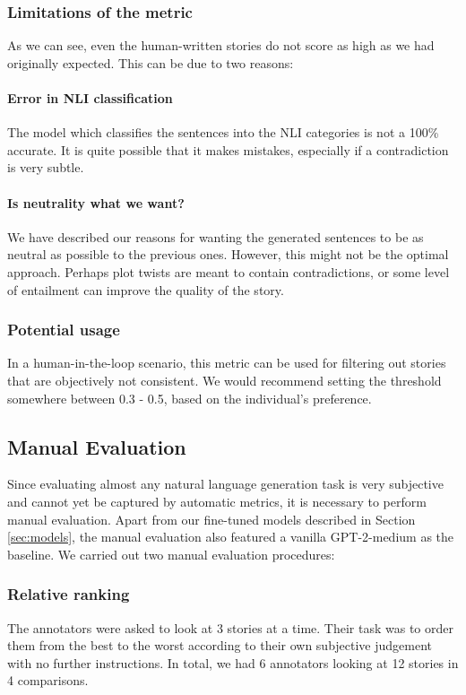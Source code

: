 \documentclass[11pt,a4paper]{article}
\begin{document}
\subsubsection{Limitations of the metric}
As we can see, even the human-written stories do not score as high as we had originally expected. This can be due to two reasons:

\paragraph{Error in NLI classification}
The model which classifies the sentences into the NLI categories is not a 100\% accurate. It is quite possible that it makes mistakes, especially if a contradiction is very subtle. 

\paragraph{Is neutrality what we want?}
We have described our reasons for wanting the generated sentences to be as neutral as possible to the previous ones. However, this might not be the optimal approach. Perhaps plot twists are meant to contain contradictions, or some level of entailment can improve the quality of the story.

\subsubsection{Potential usage}
In a human-in-the-loop scenario, this metric can be used for filtering out stories that are objectively not consistent. We would recommend setting the threshold somewhere between 0.3 - 0.5, based on the individual's preference.

\subsection{Manual Evaluation}
Since evaluating almost any natural language generation task is very subjective and cannot yet be captured by automatic metrics, it is necessary to perform manual evaluation. Apart from our fine-tuned models described in Section \ref{sec:models}, the manual evaluation also featured a vanilla GPT-2-medium as the baseline.
We carried out two manual evaluation procedures:

\subsubsection{Relative ranking}
The annotators were asked to look at 3 stories at a time. Their task was to order them from the best to the worst according to their own subjective judgement with no further instructions. In total, we had 6 annotators looking at 12 stories in 4 comparisons. 
\end{document}
